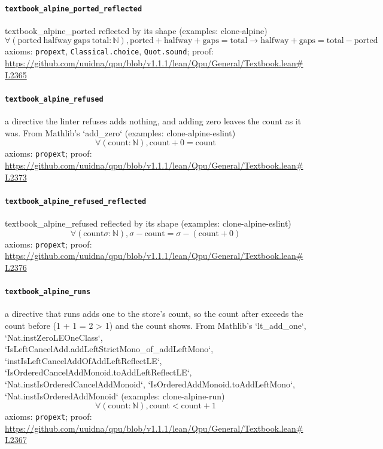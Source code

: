 \documentclass[11pt]{article}
\begin{document}
\paragraph{\texttt{textbook\_alpine\_ported\_reflected}}
textbook\_alpine\_ported reflected by its shape (examples: clone-alpine)
\[ \forall (\mathrm{ported}\ \mathrm{halfway}\ \mathrm{gaps}\ \mathrm{total} : \mathbb{N}), \mathrm{ported} + \mathrm{halfway} + \mathrm{gaps} = \mathrm{total} \to \mathrm{halfway} + \mathrm{gaps} = \mathrm{total} - \mathrm{ported} \]
\noindent axioms: \texttt{propext}, \texttt{Classical.choice}, \texttt{Quot.sound}; proof: \url{https://github.com/uuidna/qpu/blob/v1.1.1/lean/Qpu/General/Textbook.lean\#L2365}

\paragraph{\texttt{textbook\_alpine\_refused}}
a directive the linter refuses adds nothing, and adding zero leaves the count as it was. From Mathlib's `add\_zero` (examples: clone-alpine-eslint)
\[ \forall (\mathrm{count} : \mathbb{N}), \mathrm{count} + 0 = \mathrm{count} \]
\noindent axioms: \texttt{propext}; proof: \url{https://github.com/uuidna/qpu/blob/v1.1.1/lean/Qpu/General/Textbook.lean\#L2373}

\paragraph{\texttt{textbook\_alpine\_refused\_reflected}}
textbook\_alpine\_refused reflected by its shape (examples: clone-alpine-eslint)
\[ \forall (\mathrm{count} \sigma : \mathbb{N}), \sigma - \mathrm{count} = \sigma - (\mathrm{count} + 0) \]
\noindent axioms: \texttt{propext}; proof: \url{https://github.com/uuidna/qpu/blob/v1.1.1/lean/Qpu/General/Textbook.lean\#L2376}

\paragraph{\texttt{textbook\_alpine\_runs}}
a directive that runs adds one to the store's count, so the count after exceeds the count before (1 + 1 = 2 > 1) and the count shows. From Mathlib's `lt\_add\_one`, `Nat.instZeroLEOneClass`, `IsLeftCancelAdd.addLeftStrictMono\_of\_addLeftMono`, `instIsLeftCancelAddOfAddLeftReflectLE`, `IsOrderedCancelAddMonoid.toAddLeftReflectLE`, `Nat.instIsOrderedCancelAddMonoid`, `IsOrderedAddMonoid.toAddLeftMono`, `Nat.instIsOrderedAddMonoid` (examples: clone-alpine-run)
\[ \forall (\mathrm{count} : \mathbb{N}), \mathrm{count} < \mathrm{count} + 1 \]
\noindent axioms: \texttt{propext}; proof: \url{https://github.com/uuidna/qpu/blob/v1.1.1/lean/Qpu/General/Textbook.lean\#L2367}
\end{document}
